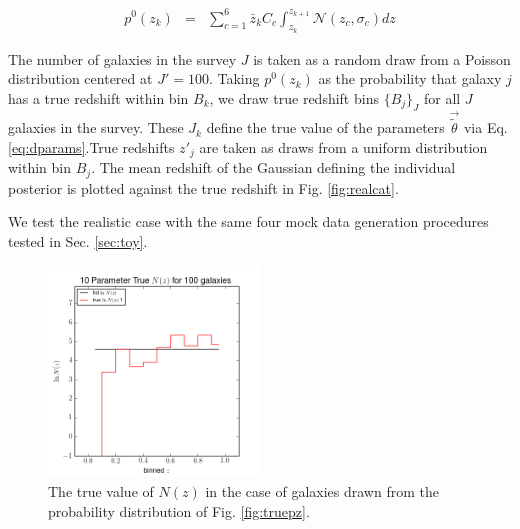 \documentclass[preprint]{aastex}
\begin{document}
\begin{eqnarray}
\label{eq:truepz}
p^{0}(z_{k}) &=& \sum_{c=1}^{6}\bar{z}_{k}C_{c}\int_{z_{k}}^{z_{k+1}} \mathcal{N}(z_{c},\sigma_{c})dz
\end{eqnarray}


The number of galaxies in the survey $J$ is taken as a random draw from a Poisson distribution centered at $J'=100$.  Taking $p^{0}(z_{k})$ as the probability that galaxy $j$ has a true redshift within bin $B_{k}$, we draw true redshift bins $\{B_{j}\}_{J}$ for all $J$ galaxies in the survey.  These $J_{k}$ define the true value of the parameters $\vec{\tilde{\theta}}$ via Eq. \ref{eq:dparams}.True redshifts $z'_{j}$ are taken as draws from a uniform distribution within bin $B_{j}$.  The mean redshift of the Gaussian defining the individual posterior is plotted against the true redshift in Fig. \ref{fig:realcat}.

We test the realistic case with the same four mock data generation procedures tested in Sec. \ref{sec:toy}.

\begin{figure}
\includegraphics[width=0.5\textwidth]{real/trueNz.png}
\caption{The true value of $N(z)$ in the case of galaxies drawn from the probability distribution of Fig. \ref{fig:truepz}.}
\label{fig:realtrueNz}
\end{figure}
\end{document}
